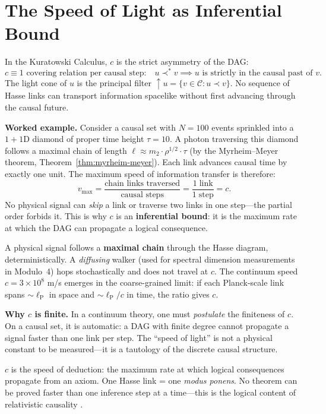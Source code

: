 \documentclass[11pt, a4paper, openany]{book}
\newcommand{\lP}{\ell_{\mathrm{P}}}
\newcommand{\covers}{\prec^*}              %
\newcounter{thm}[chapter]
\begin{document}
\section{The Speed of Light as Inferential Bound}\label{sec:speed-of-light}

\begin{definition}\label{def:speed-of-light}
In the Kuratowski Calculus, $c$ is the strict asymmetry of the DAG:
\[
  c \equiv 1 \text{ covering relation per causal step:}\quad
  u \covers v \implies u \text{ is strictly in the causal past of } v.
\]
The light cone of $u$ is the principal filter
${\uparrow}u = \{v \in \mathcal{C} : u \prec v\}$. No sequence of Hasse
links can transport information spacelike without first advancing through
the causal future.
\end{definition}

\noindent
\textbf{Worked example.} Consider a causal set with $N = 100$ events
sprinkled into a $1{+}1$D diamond of proper time height $\tau = 10$.
A photon traversing this diamond follows a maximal chain of length
$\ell \approx m_2 \cdot \rho^{1/2} \cdot \tau$ (by the Myrheim--Meyer
theorem, Theorem~\ref{thm:myrheim-meyer}). Each link advances causal
time by exactly one unit. The maximum speed of information transfer
is therefore:
\[
  v_{\max} = \frac{\text{chain links traversed}}{\text{causal steps}}
  = \frac{1\;\text{link}}{1\;\text{step}} = c.
\]
No physical signal can \emph{skip} a link or traverse two links in one
step---the partial order forbids it. This is why $c$ is an
\textbf{inferential bound}: it is the maximum rate at which the DAG can
propagate a logical consequence.

\medskip\noindent
A physical signal follows a \textbf{maximal chain} through the Hasse
diagram, deterministically. A \emph{diffusing} walker (used for spectral
dimension measurements in Modulo~4) hops stochastically and does not
travel at $c$. The continuum speed $c = 3 \times 10^8$ m/s emerges in
the coarse-grained limit: if each Planck-scale link spans $\sim \lP$
in space and $\sim \lP/c$ in time, the ratio gives $c$.

\medskip\noindent
\textbf{Why $c$ is finite.} In a continuum theory, one must \emph{postulate}
the finiteness of $c$. On a causal set, it is automatic: a DAG with
finite degree cannot propagate a signal faster than one link per step.
The ``speed of light'' is not a physical constant to be measured---it is
a tautology of the discrete causal structure.

\begin{logicalreading}
$c$ is the speed of deduction: the maximum rate at which
logical consequences propagate from an axiom. One Hasse link = one
\emph{modus ponens}. No theorem can be proved faster than one inference
step at a time---this is the logical content of relativistic causality
\cite{stone1936}.
\end{logicalreading}
\end{document}
